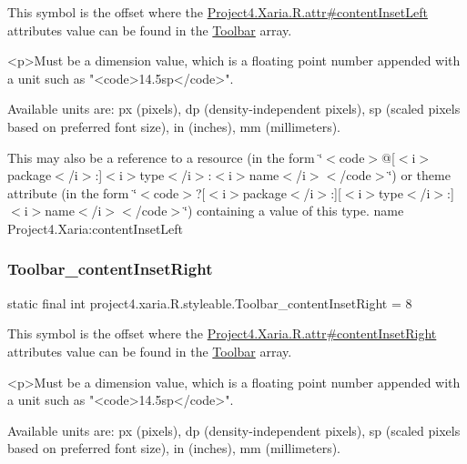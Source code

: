 This symbol is the offset where the \hyperlink{}{Project4.\+Xaria.\+R.\+attr\#content\+Inset\+Left} attribute\textquotesingle{}s value can be found in the \hyperlink{classproject4_1_1xaria_1_1R_1_1styleable_af6c30f9e9e086f6bf4e510669443fa59}{Toolbar} array.

\begin{DoxyVerb}      <p>Must be a dimension value, which is a floating point number appended with a unit such as "<code>14.5sp</code>".
\end{DoxyVerb}
 Available units are\+: px (pixels), dp (density-\/independent pixels), sp (scaled pixels based on preferred font size), in (inches), mm (millimeters). 

This may also be a reference to a resource (in the form \char`\"{}$<$code$>$@\mbox{[}$<$i$>$package$<$/i$>$\+:\mbox{]}$<$i$>$type$<$/i$>$\+:$<$i$>$name$<$/i$>$$<$/code$>$\char`\"{}) or theme attribute (in the form \char`\"{}$<$code$>$?\mbox{[}$<$i$>$package$<$/i$>$\+:\mbox{]}\mbox{[}$<$i$>$type$<$/i$>$\+:\mbox{]}$<$i$>$name$<$/i$>$$<$/code$>$\char`\"{}) containing a value of this type.  name Project4.\+Xaria\+:content\+Inset\+Left \mbox{\label{classproject4_1_1xaria_1_1R_1_1styleable_a52a6ed0d0c3dfe919f77ed1729daf3f9}} 
\subsubsection{\texorpdfstring{Toolbar\+\_\+content\+Inset\+Right}{Toolbar\_contentInsetRight}}
{\footnotesize\ttfamily static final int project4.\+xaria.\+R.\+styleable.\+Toolbar\+\_\+content\+Inset\+Right = 8\hspace{0.3cm}{\ttfamily [static]}}

This symbol is the offset where the \hyperlink{}{Project4.\+Xaria.\+R.\+attr\#content\+Inset\+Right} attribute\textquotesingle{}s value can be found in the \hyperlink{classproject4_1_1xaria_1_1R_1_1styleable_af6c30f9e9e086f6bf4e510669443fa59}{Toolbar} array.

\begin{DoxyVerb}      <p>Must be a dimension value, which is a floating point number appended with a unit such as "<code>14.5sp</code>".
\end{DoxyVerb}
 Available units are\+: px (pixels), dp (density-\/independent pixels), sp (scaled pixels based on preferred font size), in (inches), mm (millimeters). 

